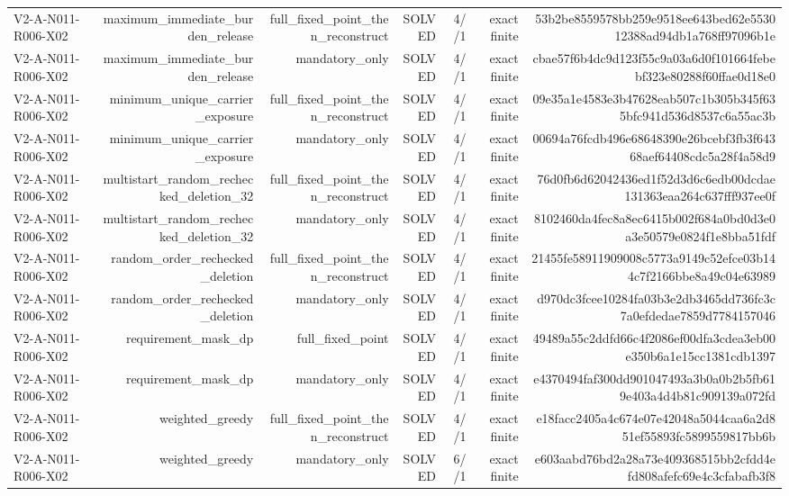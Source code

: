 {\begin{longtable}{lrrrrrr}
V2-A-N011-R006-X02 & maximum\_immediate\_burden\_release & full\_fixed\_point\_then\_reconstruct & SOLVED & 4//1 & exact finite & 53b2be8559578bb259e9518ee643bed62e553012388ad94db1a768ff97096b1e \\
V2-A-N011-R006-X02 & maximum\_immediate\_burden\_release & mandatory\_only & SOLVED & 4//1 & exact finite & cbae57f6b4dc9d123f55c9a03a6d0f101664febebf323e80288f60ffae0d18e0 \\
V2-A-N011-R006-X02 & minimum\_unique\_carrier\_exposure & full\_fixed\_point\_then\_reconstruct & SOLVED & 4//1 & exact finite & 09e35a1e4583e3b47628eab507c1b305b345f635bfc941d536d8537c6a55ac3b \\
V2-A-N011-R006-X02 & minimum\_unique\_carrier\_exposure & mandatory\_only & SOLVED & 4//1 & exact finite & 00694a76fcdb496e68648390e26bcebf3fb3f64368aef64408cdc5a28f4a58d9 \\
V2-A-N011-R006-X02 & multistart\_random\_rechecked\_deletion\_32 & full\_fixed\_point\_then\_reconstruct & SOLVED & 4//1 & exact finite & 76d0fb6d62042436ed1f52d3d6c6edb00dcdae131363eaa264c637fff937ee0f \\
V2-A-N011-R006-X02 & multistart\_random\_rechecked\_deletion\_32 & mandatory\_only & SOLVED & 4//1 & exact finite & 8102460da4fec8a8ec6415b002f684a0bd0d3e0a3e50579e0824f1e8bba51fdf \\
V2-A-N011-R006-X02 & random\_order\_rechecked\_deletion & full\_fixed\_point\_then\_reconstruct & SOLVED & 4//1 & exact finite & 21455fe58911909008c5773a9149c52efce03b144c7f2166bbe8a49c04e63989 \\
V2-A-N011-R006-X02 & random\_order\_rechecked\_deletion & mandatory\_only & SOLVED & 4//1 & exact finite & d970dc3fcee10284fa03b3e2db3465dd736fc3c7a0efdedae7859d7784157046 \\
V2-A-N011-R006-X02 & requirement\_mask\_dp & full\_fixed\_point & SOLVED & 4//1 & exact finite & 49489a55c2ddfd66c4f2086ef00dfa3cdea3eb00e350b6a1e15cc1381cdb1397 \\
V2-A-N011-R006-X02 & requirement\_mask\_dp & mandatory\_only & SOLVED & 4//1 & exact finite & e4370494faf300dd901047493a3b0a0b2b5fb619e403a4d4b81c909139a072fd \\
V2-A-N011-R006-X02 & weighted\_greedy & full\_fixed\_point\_then\_reconstruct & SOLVED & 4//1 & exact finite & e18facc2405a4c674e07e42048a5044caa6a2d851ef55893fc5899559817bb6b \\
V2-A-N011-R006-X02 & weighted\_greedy & mandatory\_only & SOLVED & 6//1 & exact finite & e603aabd76bd2a28a73e409368515bb2cfdd4efd808afefc69e4c3cfabafb3f8 \\

\end{longtable}}

